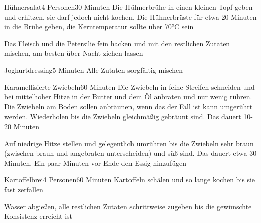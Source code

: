 \begin{recipe}{Hühnersalat}{4 Personen}{30 Minuten}
Die Hühnerbrühe in einen kleinen Topf geben und erhitzen, sie darf jedoch nicht kochen. Die Hühnerbrüste für etwa 20 Minuten in die Brühe geben, die Kerntemperatur sollte über 70°C sein

Das Fleisch und die Petersilie fein hacken und mit den restlichen Zutaten mischen, am besten über Nacht ziehen lassen
\end{recipe}


\begin{recipe}{Joghurtdressing}{}{5 Minuten}
Alle Zutaten sorgfältig mischen
\end{recipe}


\begin{recipe}{Karamellisierte Zwiebeln}{}{60 Minuten}
Die Zwiebeln in feine Streifen schneiden und bei mittelhoher Hitze in der Butter und dem Öl anbraten und nur wenig rühren. Die Zwiebeln am Boden sollen anbräunen, wenn das der Fall ist kann umgerührt werden. Wiederholen bis die Zwiebeln gleichmäßig gebräunt sind. Das dauert 10-20 Minuten

Auf niedrige Hitze stellen und gelegentlich umrühren bis die Zwiebeln sehr braun (zwischen braun und angebraten unterscheiden) und süß sind. Das dauert etwa 30 Minuten. Ein paar Minuten vor Ende den Essig hinzufügen
\end{recipe}


\begin{recipe}{Kartoffelbrei}{4 Personen}{60 Minuten}
Kartoffeln schälen und so lange kochen bis sie fast zerfallen

Wasser abgießen, alle restlichen Zutaten schrittweise zugeben bis die gewünschte Konsistenz erreicht ist
\end{recipe}

